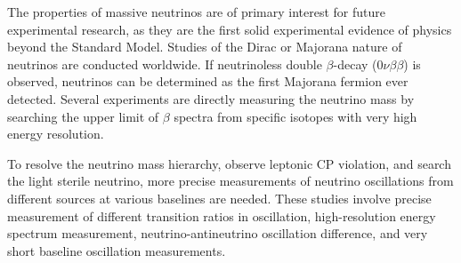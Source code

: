 \label{ch1sec7}
    
    The properties of massive neutrinos are of primary interest for future experimental research, as they are the first solid experimental evidence of physics beyond the Standard Model.  
    Studies of the Dirac or Majorana nature of neutrinos are conducted worldwide. 
    If neutrinoless double $\beta$-decay ($0\nu\beta\beta$) is observed, neutrinos can be determined as the first Majorana fermion ever detected.
    Several experiments are directly measuring the neutrino mass by searching the upper limit of $\beta$ spectra from specific isotopes with very high energy resolution. 
    
    To resolve the neutrino mass hierarchy, observe leptonic CP violation, and search the light sterile neutrino, more precise measurements of neutrino oscillations from different sources at various baselines are needed. 
    These studies involve precise measurement of different transition ratios in oscillation, high-resolution energy spectrum measurement, neutrino-antineutrino oscillation difference, and very short baseline oscillation measurements.